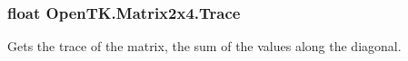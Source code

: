 \hypertarget{struct_open_t_k_1_1_matrix2x4_afe6fd0f69b274994ab761676abe6aa2f}{
\subsubsection[{Trace}]{\setlength{\rightskip}{0pt plus 5cm}float Open\-T\-K.\-Matrix2x4.\-Trace\hspace{0.3cm}{\ttfamily [get]}}}\label{struct_open_t_k_1_1_matrix2x4_afe6fd0f69b274994ab761676abe6aa2f}


Gets the trace of the matrix, the sum of the values along the diagonal. 


